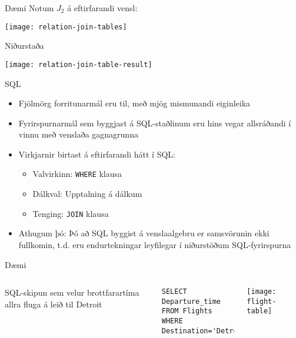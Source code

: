 \documentclass[handout]{beamer}
\begin{document}
\begin{frame}{Dæmi}
Notum $J_2$ á eftirfarandi vensl:
\begin{center}
\texttt{[image: relation-join-tables]}
\end{center}
\end{frame}
\begin{frame}{Niðurstaða}
\begin{center}
\texttt{[image: relation-join-table-result]}
\end{center}
\end{frame}

\begin{frame}{SQL}
    \begin{itemize}
        \item Fjölmörg forritunarmál eru til, með mjög mismunandi eiginleika
        \item Fyrirspurnarmál sem byggjast á SQL-staðlinum eru hins vegar allsráðandi í vinnu með venslaða gagnagrunna
        \item Virkjarnir birtast á eftirfarandi hátt í SQL:
        \begin{itemize}
            \item Valvirkinn: \texttt{WHERE} klausa
            \item Dálkval: Upptalning á dálkum
            \item Tenging: \texttt{JOIN} klausa
        \end{itemize}
        \item Athugum þó: Þó að SQL byggist á venslaalgebru er samsvörunin ekki fullkomin, t.d. eru endurtekningar leyfilegar í niðurstöðum SQL-fyrirspurna
    \end{itemize}    
\end{frame}

\begin{frame}[fragile]{Dæmi}
\begin{columns}
SQL-skipun sem velur brottfarartíma allra fluga á leið til Detroit 
\vspace{0.5cm}
\begin{verbatim}
SELECT Departure_time
FROM Flights
WHERE Destination='Detroit';
\end{verbatim}

\begin{center}
\texttt{[image: flight-table]}
\vspace{1cm}
\end{center}
\end{columns}
\end{frame}
\end{document}
